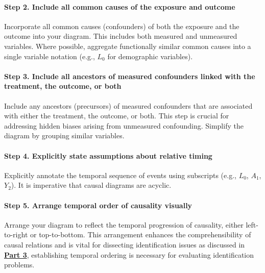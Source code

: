 \documentclass[
  single column]{article}
\let\oldparagraph\paragraph
\renewcommand{\paragraph}[1]{\oldparagraph{#1}\mbox{}}
\begin{document}
\paragraph{Step 2. Include all common causes of the exposure and
outcome}\label{step-2.-include-all-common-causes-of-the-exposure-and-outcome}

Incorporate all common causes (confounders) of both the exposure and the
outcome into your diagram. This includes both measured and unmeasured
variables. Where possible, aggregate functionally similar common causes
into a single variable notation (e.g., \(L_0\) for demographic
variables).

\paragraph{Step 3. Include all ancestors of measured confounders linked
with the treatment, the outcome, or
both}\label{step-3.-include-all-ancestors-of-measured-confounders-linked-with-the-treatment-the-outcome-or-both}

Include any ancestors (precursors) of measured confounders that are
associated with either the treatment, the outcome, or both. This step is
crucial for addressing hidden biases arising from unmeasured
confounding. Simplify the diagram by grouping similar variables.

\paragraph{Step 4. Explicitly state assumptions about relative
timing}\label{step-4.-explicitly-state-assumptions-about-relative-timing}

Explicitly annotate the temporal sequence of events using subscripts
(e.g., \(L_0\), \(A_1\), \(Y_2\)). It is imperative that causal diagrams
are acyclic.

\paragraph{Step 5. Arrange temporal order of causality
visually}\label{step-5.-arrange-temporal-order-of-causality-visually}

Arrange your diagram to reflect the temporal progression of causality,
either left-to-right or top-to-bottom. This arrangement enhances the
comprehensibility of causal relations and is vital for dissecting
identification issues as discussed in \hyperref[sec-part3]{\textbf{Part
3}}, establishing temporal ordering is necessary for evaluating
identification problems.
\end{document}
